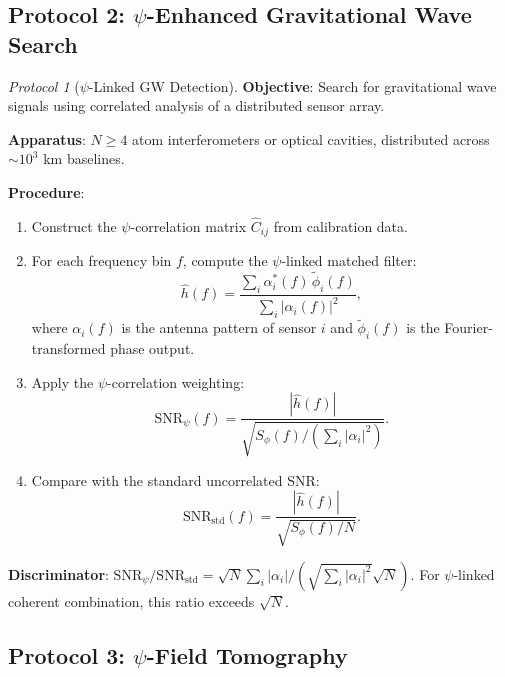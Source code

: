 \documentclass[12pt,a4paper]{article}
\theoremstyle{remark}
\newtheorem{protocol}{Protocol}
\begin{document}
\subsection{Protocol 2: $\psi$-Enhanced Gravitational Wave Search}

\begin{protocol}[$\psi$-Linked GW Detection]\label{prot:gw-search}
\textbf{Objective}: Search for gravitational wave signals using correlated
analysis of a distributed sensor array.

\textbf{Apparatus}: $N \geq 4$ atom interferometers or optical cavities,
distributed across $\sim 10^3$ km baselines.

\textbf{Procedure}:
\begin{enumerate}
\item Construct the $\psi$-correlation matrix $\hat{C}_{ij}$ from
calibration data.
\item For each frequency bin $f$, compute the $\psi$-linked matched filter:
\begin{equation}
\hat{h}(f) = \frac{\sum_i \alpha_i^*(f)\,\tilde{\phi}_i(f)}{\sum_i |\alpha_i(f)|^2},
\end{equation}
where $\alpha_i(f)$ is the antenna pattern of sensor $i$ and
$\tilde{\phi}_i(f)$ is the Fourier-transformed phase output.
\item Apply the $\psi$-correlation weighting:
\begin{equation}
\text{SNR}_\psi(f) = \frac{|\hat{h}(f)|}{\sqrt{S_\phi(f)/\left(\sum_i |\alpha_i|^2\right)}}.
\end{equation}
\item Compare with the standard uncorrelated SNR:
\begin{equation}
\text{SNR}_{\text{std}}(f) = \frac{|\hat{h}(f)|}{\sqrt{S_\phi(f)/N}}.
\end{equation}
\end{enumerate}

\textbf{Discriminator}: $\text{SNR}_\psi/\text{SNR}_{\text{std}} =
\sqrt{N}\sum_i|\alpha_i|/(\sqrt{\sum_i|\alpha_i|^2}\sqrt{N})$. For
$\psi$-linked coherent combination, this ratio exceeds $\sqrt{N}$.
\end{protocol}

\subsection{Protocol 3: $\psi$-Field Tomography}
\end{document}
